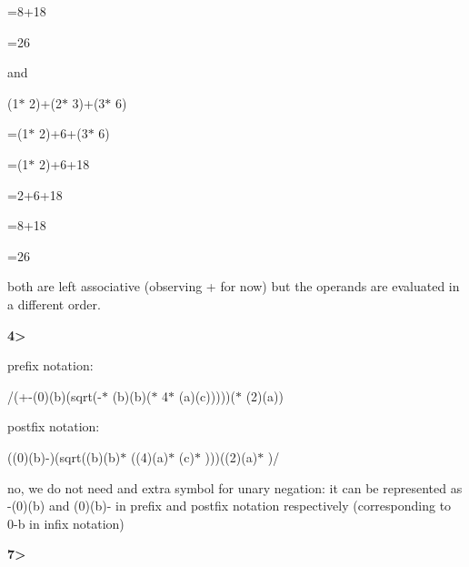 \documentclass[12pt]{article}
\renewcommand{\_}{\kern-1.5pt\textunderscore\kern-1.5pt}
\begin{document}
=8+18\par

=26\par


\vspace{\baselineskip}
and \par


\vspace{\baselineskip}
(1$\ast$ 2)+(2$\ast$ 3)+(3$\ast$ 6)\par

=(1$\ast$ 2)+6+(3$\ast$ 6)\par

=(1$\ast$ 2)+6+18\par

=2+6+18\par

=8+18\par

=26\par


\vspace{\baselineskip}
both are left associative (observing + for now) but the operands are evaluated in a different order.\par


\vspace{\baselineskip}

\vspace{\baselineskip}
\textbf{4>}\par

prefix notation:\par

/(+-(0)(b)(sqrt(-$\ast$ (b)(b)($\ast$ 4$\ast$ (a)(c)))))($\ast$ (2)(a))\par


\vspace{\baselineskip}
postfix notation:\par

((0)(b)-)(sqrt((b)(b)$\ast$ ((4)(a)$\ast$ (c)$\ast$ )))((2)(a)$\ast$ )/\par


\vspace{\baselineskip}
no, we do not need and extra symbol for unary negation: it can be represented as -(0)(b) and (0)(b)- in prefix and postfix notation respectively (corresponding to 0-b in infix notation)\par


\vspace{\baselineskip}
\textbf{7>}\par
\end{document}
